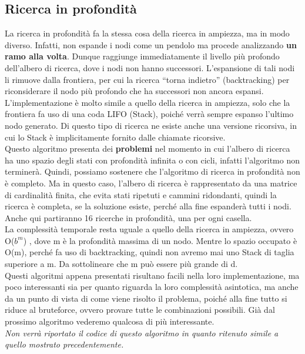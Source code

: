 \documentclass[10pt,a4paper]{article}
\begin{document}
	\subsection{Ricerca in profondità}
	La ricerca in profondità fa la stessa cosa della ricerca in ampiezza, ma in modo diverso. Infatti, non espande i nodi come un pendolo ma procede analizzando \textbf{un ramo alla volta}. Dunque raggiunge immediatamente il livello più profondo dell'albero di ricerca, dove i nodi non hanno successori. L’espansione di tali nodi li rimuove dalla frontiera, per cui la ricerca “torna indietro” (backtracking) per riconsiderare il nodo più profondo che ha successori non ancora espansi. L'implementazione è molto simile a quello della ricerca in ampiezza, solo che la frontiera fa uso di una coda LIFO (Stack), poiché verrà sempre espanso l’ultimo nodo generato. Di questo tipo di ricerca ne esiste anche una versione ricorsiva, in cui lo Stack è implicitamente fornito dalle chiamate ricorsive.\\
	Questo algoritmo presenta dei \textbf{problemi} nel momento in cui l’albero di ricerca ha uno spazio degli stati con profondità infinita o con cicli, infatti l’algoritmo non terminerà. Quindi, possiamo sostenere che l’algoritmo di ricerca in profondità non è completo.
	Ma in questo caso, l'albero di ricerca è rappresentato da una matrice di cardinalità finita, che evita stati ripetuti e cammini ridondanti, quindi la ricerca è completa, se la soluzione esiste, perché alla fine espanderà tutti i nodi.\\
	Anche qui partiranno 16 ricerche in profondità, una per ogni casella.\\
	La complessità temporale resta uguale a quello della ricerca in ampiezza, ovvero O($b^m$) , dove m è la profondità massima di un nodo. Mentre lo spazio occupato è O(m), perché fa uso di backtracking, quindi non avremo mai uno Stack di taglia superiore a m. Da sottolineare che m può essere più grande di d.\\
	Questi algoritmi appena presentati risultano facili nella loro implementazione, ma poco interessanti sia per quanto riguarda la loro complessità asintotica, ma anche da un punto di vista di come viene risolto il problema, poiché alla fine tutto si riduce al bruteforce, ovvero provare tutte le combinazioni possibili. Già dal prossimo algoritmo vederemo qualcosa di più interessante.\\
	\small{\textit{Non verrà riportato il codice di questo algoritmo in quanto ritenuto simile a quello mostrato precedentemente.}}\\
\end{document}
